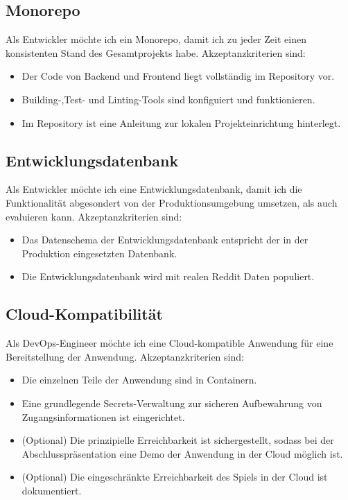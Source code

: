 \documentclass[a4paper, 10pt, conference]{ieeeconf}
\begin{document}
\subsection{Monorepo}

Als Entwickler möchte ich ein Monorepo, damit ich zu jeder Zeit einen konsistenten Stand des Gesamtprojekts habe.  Akzeptanzkriterien sind:
\begin{itemize}
\item Der Code von Backend und Frontend liegt vollständig im Repository vor.
\item Building-,Test- und Linting-Tools sind konfiguiert und funktionieren.
\item Im Repository ist eine Anleitung zur lokalen Projekteinrichtung hinterlegt.
\end{itemize}

\subsection{Entwicklungsdatenbank}

Als Entwickler möchte ich eine Entwicklungsdatenbank, damit ich die Funktionalität abgesondert von der Produktionsumgebung umsetzen, als auch evaluieren kann.  Akzeptanzkriterien sind:
\begin{itemize}
\item Das Datenschema der Entwicklungsdatenbank entspricht der in der Produktion eingesetzten Datenbank.
\item Die Entwicklungsdatenbank wird mit realen Reddit Daten populiert. 
\end{itemize}

\subsection{Cloud-Kompatibilität}

Als DevOps-Engineer möchte ich eine Cloud-kompatible Anwendung für eine Bereitstellung der Anwendung.  Akzeptanzkriterien sind:
\begin{itemize}
\item Die einzelnen Teile der Anwendung sind in Containern.
\item Eine grundlegende Secrets-Verwaltung zur sicheren Aufbewahrung von Zugangsinformationen ist eingerichtet.
\item (Optional) Die prinzipielle Erreichbarkeit ist sichergestellt,  sodass bei der Abschlusspräsentation eine Demo der Anwendung in der Cloud möglich ist.
\item (Optional) Die eingeschränkte Erreichbarkeit des Spiels in der Cloud ist dokumentiert.
\end{itemize}
\end{document}
